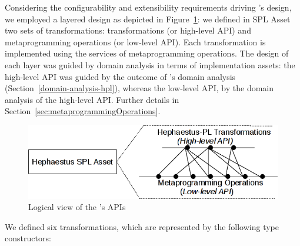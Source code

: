 Considering the configurability and extensibility requirements driving \hpl's design, we employed a layered design as depicted in Figure~\ref{fig:apis-hpl-asset}: we defined in \hp{} SPL Asset two sets of transformations: \hpl{} transformations (or high-level API) and metaprogramming operations (or low-level API). Each \hpl{} transformation is implemented using the services of metaprogramming operations. The design of each layer was guided by domain analysis in terms of implementation assets: the high-level API was guided by the outcome of \hpl{}'s domain analysis  (Section~\ref{domain-analysis-hpl}), whereas  the low-level API, by the domain analysis of the high-level API. Further details in Section~\ref{sec:metaprogrammingOperations}.


\begin{figure}[htb]
\includegraphics[scale=0.7]{imagens/apis-hpl-asset.png}
\caption{Logical view of the \hpl's APIs}
\label{fig:apis-hpl-asset}
\end{figure}


We defined six \hpl{} transformations, which are represented by the following type constructors:

